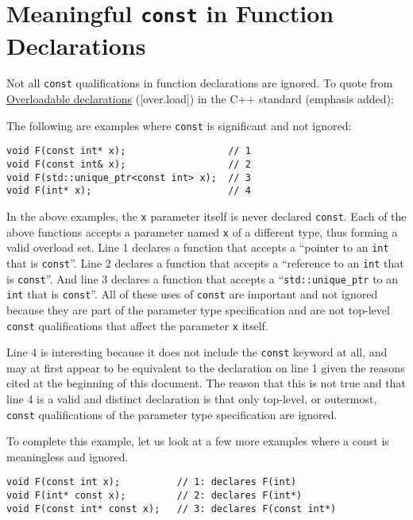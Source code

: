 \section{Meaningful \texorpdfstring{\texttt{const}}{} in Function Declarations}
Not all \texttt{const} qualifications in function declarations are ignored. To quote from \href{http://eel.is/c++draft/over.load}{Overloadable declarations} ([over.load]) in the C++ standard (emphasis added):


The following are examples where \texttt{const} is significant and not ignored:
\begin{verbatim}
void F(const int* x);                  // 1
void F(const int& x);                  // 2
void F(std::unique_ptr<const int> x);  // 3
void F(int* x);                        // 4
\end{verbatim}

In the above examples, the \texttt{x} parameter itself is never declared \texttt{const}. Each of the above functions accepts a parameter named \texttt{x} of a different type, thus forming a valid overload set. Line 1 declares a function that accepts a \enquote{pointer to an \texttt{int} that is \texttt{const}}. Line 2 declares a function that accepts a \enquote{reference to an \texttt{int} that is \texttt{const}}. And line 3 declares a function that accepts a \enquote{\texttt{std::unique_ptr} to an \texttt{int} that is \texttt{const}}. All of these uses of \texttt{const} are important and not ignored because they are part of the parameter type specification and are not top-level \texttt{const} qualifications that affect the parameter \texttt{x} itself.

Line 4 is interesting because it does not include the \texttt{const} keyword at all, and may at first appear to be equivalent to the declaration on line 1 given the reasons cited at the beginning of this document. The reason that this is not true and that line 4 is a valid and distinct declaration is that only top-level, or outermost, \texttt{const} qualifications of the parameter type specification are ignored.

To complete this example, let us look at a few more examples where a const is meaningless and ignored.
\begin{verbatim}
void F(const int x);          // 1: declares F(int)
void F(int* const x);         // 2: declares F(int*)
void F(const int* const x);   // 3: declares F(const int*)
\end{verbatim}


